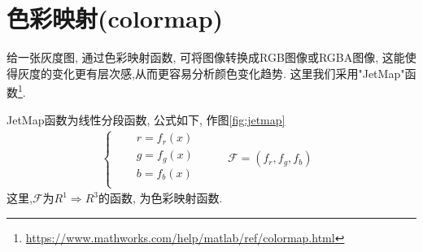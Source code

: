 \section{色彩映射(colormap)}

给一张灰度图, 通过色彩映射函数, 可将图像转换成RGB图像或RGBA图像, 这能使得灰度的变化更有层次感,从而更容易分析颜色变化趋势. 这里我们采用"JetMap"函数\footnote{\url{https://www.mathworks.com/help/matlab/ref/colormap.html}}.


JetMap函数为线性分段函数, 公式如下, 作图\ref{fig:jetmap}
\begin{eqnarray}
    \left\{
        \begin{aligned}
            \quad & r = f_r(x)&\\
            \nonumber
            \quad &g = f_g(x)&\\
            \nonumber
            \quad &b = f_b(x)&\\
		\end{aligned}
    \right.
    \quad &\mathcal{F} = (f_r,f_g,f_b)&
    \label{eq:jetmap}
\end{eqnarray}
这里,$\mathcal{F}$为$R^1\Rightarrow R^3$的函数, 为色彩映射函数.


